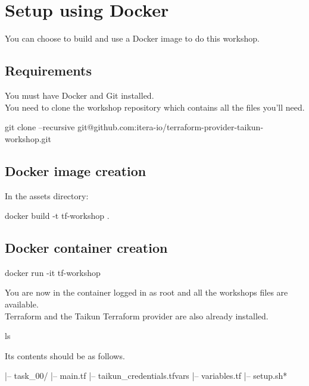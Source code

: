 \section{Setup using Docker}\label{sec:docker}

You can choose to build and use a Docker image to do this workshop.

\subsection{Requirements}

You must have Docker and Git installed.\\
You need to clone the workshop repository which contains all the files you'll need.

\begin{shell}
git clone --recursive git@github.com:itera-io/terraform-provider-taikun-workshop.git
\end{shell}

\subsection{Docker image creation}

In the assets directory:
\begin{shell}
docker build -t tf-workshop .
\end{shell}

\subsection{Docker container creation}

\begin{shell}
docker run -it tf-workshop
\end{shell}
You are now in the container logged in as root and all the workshops files are available.\\
Terraform and the Taikun Terraform provider are also already installed.

\begin{shell}
ls
\end{shell}
Its contents should be as follows.
\begin{raw}
|-- task_00/
    |-- main.tf
    |-- taikun_credentials.tfvars
    |-- variables.tf
|-- setup.sh*
\end{raw}

